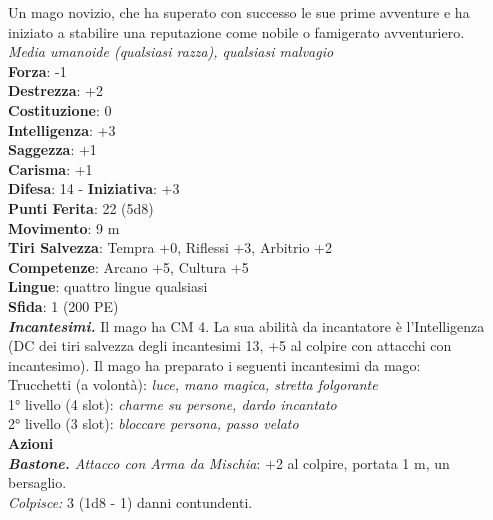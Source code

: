 \begin{multicols}{2}
Un mago novizio, che ha superato con successo le sue prime avventure e ha iniziato a stabilire una reputazione come nobile o famigerato avventuriero.\\
\emph{Media umanoide (qualsiasi razza), qualsiasi malvagio}\\
\textbf{Forza}: -1\\
\textbf{Destrezza}: +2\\
\textbf{Costituzione}: 0\\
\textbf{Intelligenza}: +3\\
\textbf{Saggezza}: +1\\
\textbf{Carisma}: +1\\
\textbf{Difesa}: 14 - \textbf{Iniziativa}: +3\\
\textbf{Punti Ferita}: 22 (5d8)\\
\textbf{Movimento}: 9 m\\
\textbf{Tiri Salvezza}: Tempra +0, Riflessi +3, Arbitrio +2 \\
\textbf{Competenze}: Arcano +5, Cultura +5\\
\textbf{Lingue}: quattro lingue qualsiasi\\
\textbf{Sfida}: 1 (200 PE)\smallskip\\
\emph{\textbf{Incantesimi.}} Il mago ha CM 4. La sua abilità da incantatore è l'Intelligenza (DC dei tiri salvezza degli incantesimi 13, +5 al colpire con attacchi con incantesimo). Il mago ha preparato i seguenti incantesimi da mago: \\
Trucchetti (a volontà): \emph{luce, mano magica, stretta folgorante} \\
1° livello (4 slot): \emph{charme su persone, dardo incantato} \\
2° livello (3 slot): \emph{bloccare persona, passo velato}\\
\smallskip\textbf{Azioni}\\
\emph{\textbf{Bastone.} Attacco con Arma da Mischia}: +2 al colpire, portata 1 m, un bersaglio.\\
\emph{Colpisce:} 3 (1d8 - 1) danni contundenti.\\


\end{multicols}
